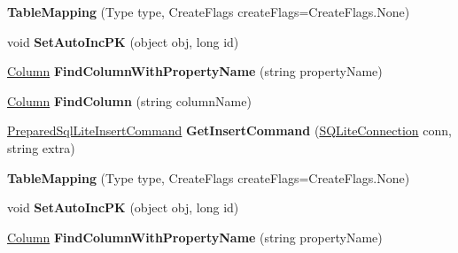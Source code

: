 \begin{DoxyCompactItemize}
\item 
\hypertarget{classSQLite_1_1TableMapping_a13e595aa07061915a33b2346497bd786}{{\bfseries Table\-Mapping} (Type type, Create\-Flags create\-Flags=Create\-Flags.\-None)}\label{classSQLite_1_1TableMapping_a13e595aa07061915a33b2346497bd786}

\item 
\hypertarget{classSQLite_1_1TableMapping_a02f2ce7280201f572621b75e106add15}{void {\bfseries Set\-Auto\-Inc\-P\-K} (object obj, long id)}\label{classSQLite_1_1TableMapping_a02f2ce7280201f572621b75e106add15}

\item 
\hypertarget{classSQLite_1_1TableMapping_ab71131c8ed49c2c5276a555af0d564f2}{\hyperlink{classSQLite_1_1TableMapping_1_1Column}{Column} {\bfseries Find\-Column\-With\-Property\-Name} (string property\-Name)}\label{classSQLite_1_1TableMapping_ab71131c8ed49c2c5276a555af0d564f2}

\item 
\hypertarget{classSQLite_1_1TableMapping_a1b6aca5cdaa9c0f8b6f5c1ecbb12affc}{\hyperlink{classSQLite_1_1TableMapping_1_1Column}{Column} {\bfseries Find\-Column} (string column\-Name)}\label{classSQLite_1_1TableMapping_a1b6aca5cdaa9c0f8b6f5c1ecbb12affc}

\item 
\hypertarget{classSQLite_1_1TableMapping_a858d8d3031d8fca47fbc24a0bc752177}{\hyperlink{classSQLite_1_1PreparedSqlLiteInsertCommand}{Prepared\-Sql\-Lite\-Insert\-Command} {\bfseries Get\-Insert\-Command} (\hyperlink{classSQLite_1_1SQLiteConnection}{S\-Q\-Lite\-Connection} conn, string extra)}\label{classSQLite_1_1TableMapping_a858d8d3031d8fca47fbc24a0bc752177}

\item 
\hypertarget{classSQLite_1_1TableMapping_a13e595aa07061915a33b2346497bd786}{{\bfseries Table\-Mapping} (Type type, Create\-Flags create\-Flags=Create\-Flags.\-None)}\label{classSQLite_1_1TableMapping_a13e595aa07061915a33b2346497bd786}

\item 
\hypertarget{classSQLite_1_1TableMapping_a02f2ce7280201f572621b75e106add15}{void {\bfseries Set\-Auto\-Inc\-P\-K} (object obj, long id)}\label{classSQLite_1_1TableMapping_a02f2ce7280201f572621b75e106add15}

\item 
\hypertarget{classSQLite_1_1TableMapping_ab71131c8ed49c2c5276a555af0d564f2}{\hyperlink{classSQLite_1_1TableMapping_1_1Column}{Column} {\bfseries Find\-Column\-With\-Property\-Name} (string property\-Name)}\label{classSQLite_1_1TableMapping_ab71131c8ed49c2c5276a555af0d564f2}


\end{DoxyCompactItemize}
